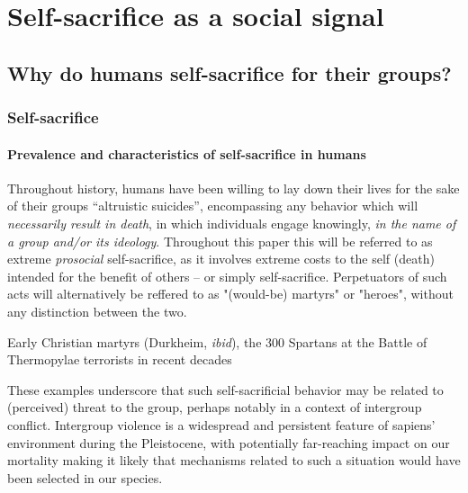 \documentclass[a4paper,12pt]{report}
\begin{document}
\part{Self-sacrifice as a social signal}


\chapter{Why do humans self-sacrifice for their groups?}
\section{Self-sacrifice}
\label{s:intro}
\subsection{Prevalence and characteristics of self-sacrifice in humans}
Throughout history, humans have been willing to lay down their lives for the sake of their groups
“altruistic suicides”,
encompassing any behavior which will \emph{necessarily result in death}, in which individuals engage
knowingly, \emph{in the name of a group and/or its ideology}. Throughout this paper this
will be referred to as extreme \emph{prosocial} self-sacrifice, as it involves extreme costs
to the self (death) intended for the benefit of others – or simply self-sacrifice.
Perpetuators of such acts will alternatively be reffered to as "(would-be) martyrs" or "heroes",
without any distinction between the two.

Early Christian martyrs (Durkheim, \emph{ibid}), the 300 Spartans at the Battle of Thermopylae
terrorists in recent decades %

These examples underscore that such self-sacrificial behavior may be related to (perceived)
threat to the group, perhaps notably in a context of intergroup conflict.
Intergroup violence is a widespread and persistent feature of sapiens’ environment
during the Pleistocene, with potentially far-reaching impact on our mortality %
making it likely that mechanisms related to such a situation would have been selected
in our species. 
\end{document}
